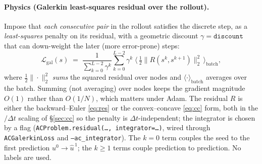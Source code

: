 \documentclass[11pt]{article}
\newcommand{\dt}{\Delta t}
\newcommand{\uhat}{\hat u}
\begin{document}
\paragraph{Physics (Galerkin least-squares residual over the rollout).}
Impose that \emph{each consecutive pair} in the rollout satisfies the discrete step, as a
\emph{least-squares} penalty on its residual, with a geometric discount $\gamma=\texttt{discount}$
that can down-weight the later (more error-prone) steps:
\begin{equation}
  \mathcal L_{\mathrm{gal}}(s)
  \;=\; \frac{1}{\sum_{k=0}^{L-2}\gamma^{k}}
        \sum_{k=0}^{L-2}\gamma^{k}\;
        \Big\langle\, \tfrac12\big\| R(s^{k},s^{k+1})\big\|_2^2 \,\Big\rangle_{\!\mathrm{batch}} ,
  \label{eq:lgal}
\end{equation}
where $\tfrac12\|\cdot\|_2^2$ \emph{sums} the squared residual over nodes and $\langle\cdot
\rangle_{\mathrm{batch}}$ averages over the batch. Summing (not averaging) over nodes keeps the
gradient magnitude $O(1)$ rather than $O(1/N)$, which matters under Adam. The residual $R$ is
either the backward--Euler \eqref{eq:res} or the convex--concave \eqref{eq:cc} form, both in the
$/\dt$ scaling of \S\ref{sec:cc} so the penalty is $\dt$-independent; the integrator is chosen by
a flag (\texttt{ACProblem.residual(\dots, integrator=\dots)}, wired through
\texttt{ACGalerkinLoss} and \texttt{--ac\_integrator}). The $k=0$ term couples the seed to the
first prediction $u^0\!\to\!\uhat^{\,1}$; the $k\ge1$ terms couple prediction to prediction. No
labels are used.
\end{document}
